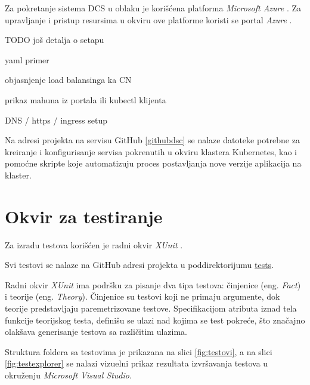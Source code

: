 \documentclass[12pt,oneside]{memoir}
\begin{document}
Za pokretanje sistema DCS u oblaku je korišćena platforma \emph{Microsoft Azure} \cite{Azure}. Za upravljanje i pristup resursima u okviru ove platforme koristi se portal \emph{Azure} \cite{AzurePortal}.

TODO još detalja o setapu

yaml primer

objasnjenje load balansinga ka CN

prikaz mahuna iz portala ili kubectl klijenta

DNS / https / ingress setup


Na adresi projekta na servisu GitHub \ref{githubdsc} se nalaze datoteke potrebne za kreiranje i konfigurisanje servisa pokrenutih u okviru klastera Kubernetes, kao i pomoćne skripte koje automatizuju proces postavljanja nove verzije aplikacija na klaster.


\section{Okvir za testiranje}
\label{chp:testiranjesistema}

Za izradu testova korišćen je radni okvir \emph{XUnit} \cite{XUnit}.

Svi testovi se nalaze na GitHub adresi projekta u poddirektorijumu \href{https://github.com/milana-kovacevic/DistributedComputationSystem/tree/main/tests}{tests}.

Radni okvir \emph{XUnit} ima podršku za pisanje dva tipa testova: činjenice (eng. \emph{Fact}) i teorije (eng. \emph{Theory}). Činjenice su testovi koji ne primaju argumente, dok teorije predstavljaju paremetrizovane testove. Specifikacijom atributa iznad tela funkcije teorijskog testa, definišu se ulazi nad kojima se test pokreće, što značajno olakšava generisanje testova sa različitim ulazima.

Struktura foldera sa testovima je prikazana na slici \ref{fig:testovi}, a na slici \ref{fig:testexplorer} se nalazi vizuelni prikaz rezultata izvršavanja testova u okruženju \emph{Microsoft Visual Studio}.
\end{document}
